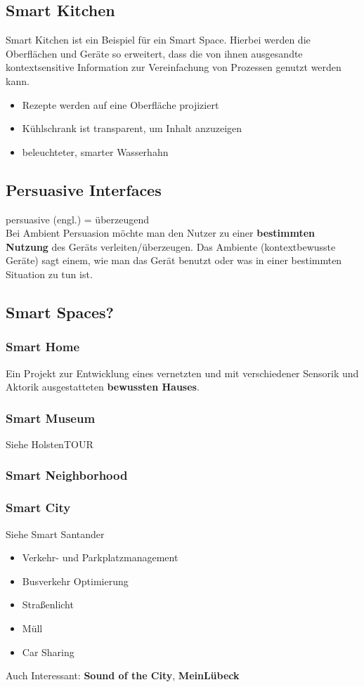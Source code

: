 \documentclass[a4paper]{article}
\begin{document}
\subsection{Smart Kitchen}
Smart Kitchen ist ein Beispiel für ein Smart Space. Hierbei werden die Oberflächen und Geräte so erweitert, dass die von ihnen ausgesandte kontextsensitive Information zur Vereinfachung von Prozessen genutzt werden kann.
\begin{itemize}
	\item Rezepte werden auf eine Oberfläche projiziert
	\item Kühlschrank ist transparent, um Inhalt anzuzeigen
	\item beleuchteter, smarter Wasserhahn
\end{itemize}
\subsection{Persuasive Interfaces}
persuasive (engl.) = überzeugend\\

Bei Ambient Persuasion möchte man den Nutzer zu einer \textbf{bestimmten Nutzung} des Geräts verleiten/überzeugen. Das Ambiente (kontextbewusste Geräte) sagt einem, wie man das Gerät benutzt oder was in einer bestimmten Situation zu tun ist.
\subsection{Smart Spaces?}
\subsubsection{Smart Home}
Ein Projekt zur Entwicklung eines vernetzten und mit verschiedener Sensorik und Aktorik ausgestatteten \textbf{bewussten Hauses}.
\subsubsection{Smart Museum}
Siehe HolstenTOUR
\subsubsection{Smart Neighborhood}
\subsubsection{Smart City}
Siehe Smart Santander
\begin{itemize}
	\item Verkehr- und Parkplatzmanagement
	\item Busverkehr Optimierung
	\item Straßenlicht
	\item Müll
	\item Car Sharing
\end{itemize}
Auch Interessant: \textbf{Sound of the City}, \textbf{MeinLübeck}
\end{document}
